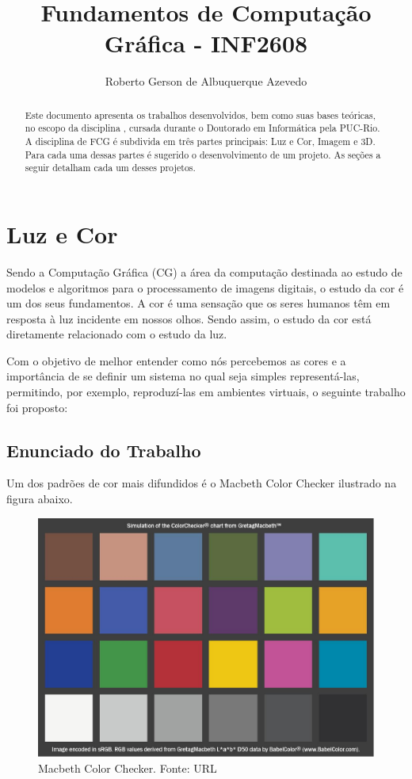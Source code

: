 \documentclass[a4paper,10pt]{report}
\title{Fundamentos de Computação Gráfica - INF2608}
\author{Roberto Gerson de Albuquerque Azevedo}
\begin{document}
\maketitle

\begin{abstract}
Este documento apresenta os trabalhos desenvolvidos, bem como suas bases
teóricas, no escopo da disciplina , cursada
durante o Doutorado em Informática pela PUC-Rio. A disciplina de FCG é subdivida
em três partes principais: Luz e Cor, Imagem e 3D. Para cada uma dessas partes é
sugerido o desenvolvimento de um projeto. As seções a seguir detalham cada um
desses projetos.
\end{abstract}

\chapter{Luz e Cor}
\par
Sendo a Computação Gráfica (CG) a área da computação destinada ao estudo de
modelos e algoritmos para o processamento de imagens digitais, o estudo da cor é
um dos seus fundamentos. A cor é uma sensação que os seres humanos têm em
resposta à luz incidente em nossos olhos. Sendo assim, o estudo da cor está
diretamente relacionado com o estudo da luz.

\par
Com o objetivo de melhor entender como nós percebemos as cores e a importância
de se definir um sistema no qual seja simples representá-las, permitindo, por
exemplo, reproduzí-las em ambientes virtuais, o seguinte trabalho foi proposto:

\section{Enunciado do Trabalho}
\par
Um dos padrões de cor mais difundidos é o Macbeth Color Checker
ilustrado na figura abaixo.

\begin{figure}[!htb]
     \centering
     \includegraphics[scale=0.4]{img/colorChecker.jpg}
     \caption{Macbeth Color Checker. Fonte: URL}
     \label{Label de referência para a imagem}
\end{figure}
\end{document}
